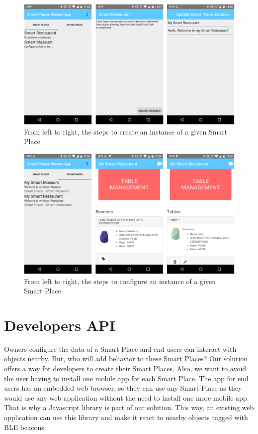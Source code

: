 \begin{figure}[!ht]
  \centering
    \includegraphics[width=1\textwidth, keepaspectratio]{images/screenshots/ownersapp}
    \caption[Create a Smart Place Instance]{From left to right, the steps to create an instance of a given Smart Place}
    \label{fig:screenshot_ownersapp}
\end{figure}

\begin{figure}[!ht]
  \centering
    \includegraphics[width=1\textwidth, keepaspectratio]{images/screenshots/ownersapp_configure}
    \caption[Configure a Smart Place Instance]{From left to right, the steps to configure an instance of a given Smart Place}
    \label{fig:screenshot_ownersapp_configure}
\end{figure}

\section{Developers API}
\label{sec:solution_developers_api}
Owners configure the data of a Smart Place and end users can interact with objects nearby.
But, who will add behavior to these Smart Places?
Our solution offers a way for developers to create their Smart Places.
Also, we want to avoid the user having to install one mobile app for each Smart Place.
The app for end users has an embedded web browser, so they can use any Smart Place as they would use any web application without the need to install one more mobile app.
That is why a Javascript library is part of our solution.
This way, an existing web application can use this library and make it react to nearby objects tagged with \gls{BLE} beacons.

